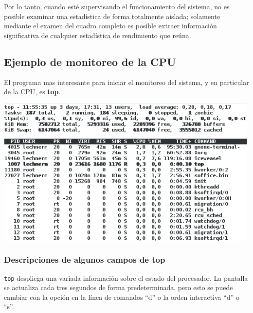 \documentclass[12pt]{article}
\begin{document}
Por lo tanto, cuando esté supervisando el funcionamiento del sistema, no 
es posible examinar una estadística de forma totalmente aislada; solamente
mediante el examen del cuadro completo es posible extraer información 
significativa de cualquier estadística de rendimiento que reúna.

\subsection*{Ejemplo de monitoreo de la CPU}

El programa mas interesante para iniciar el monitoreo del sistema, y en 
particular de la CPU, es \textbf{top}.


\begin{center}
 \includegraphics{top.png}
\end{center}

\subsubsection*{Descripciones de algunos campos de top}
\texttt{top} despliega  una variada información sobre el estado del 
procesador. La pantalla se actualiza cada tres segundos de forma 
predeterminada, pero esto se puede cambiar con la opción en la línea de 
comandos ``d'' o la orden interactiva ``d'' o ``s''.
\end{document}
